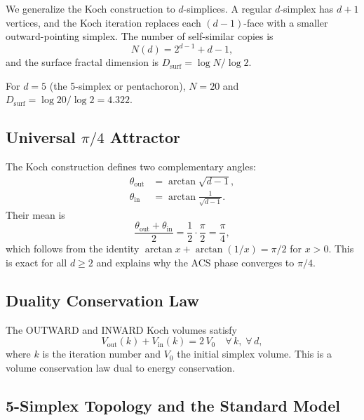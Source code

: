 \documentclass[twocolumn,showpacs,preprintnumbers,amsmath,amssymb,prl]{revtex4-2}
\begin{document}
We generalize the Koch construction to $d$-simplices. A regular
$d$-simplex has $d+1$ vertices, and the Koch iteration replaces each
$(d{-}1)$-face with a smaller outward-pointing simplex. The number of
self-similar copies is
\begin{equation}
    N(d) = 2^{d-1} + d - 1,
\end{equation}
and the surface fractal dimension is $D_{\text{surf}} = \log N / \log 2$.

For $d = 5$ (the 5-simplex or pentachoron), $N = 20$ and
$D_{\text{surf}} = \log 20 / \log 2 = 4.322$.

\subsection{Universal $\pi/4$ Attractor}

The Koch construction defines two complementary angles:
\begin{align}
    \theta_{\text{out}} &= \arctan\!\sqrt{d-1}, \\
    \theta_{\text{in}}  &= \arctan\!\frac{1}{\sqrt{d-1}}.
\end{align}
Their mean is
\begin{equation}
    \frac{\theta_{\text{out}} + \theta_{\text{in}}}{2}
    = \frac{1}{2}\cdot\frac{\pi}{2} = \frac{\pi}{4},
    \label{eq:pi4}
\end{equation}
which follows from the identity
$\arctan x + \arctan(1/x) = \pi/2$ for $x > 0$.
This is exact for all $d \geq 2$ and explains why the ACS phase
converges to $\pi/4$.

\subsection{Duality Conservation Law}

The OUTWARD and INWARD Koch volumes satisfy
\begin{equation}
    V_{\text{out}}(k) + V_{\text{in}}(k) = 2\,V_0
    \quad \forall\, k,\; \forall\, d,
    \label{eq:duality}
\end{equation}
where $k$ is the iteration number and $V_0$ the initial simplex volume.
This is a volume conservation law dual to energy conservation.

\subsection{5-Simplex Topology and the Standard Model}
\end{document}
